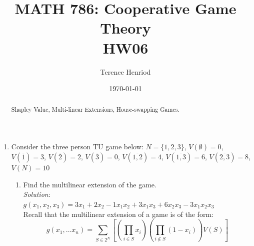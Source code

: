 \documentclass{article}
\title{MATH 786: Cooperative Game Theory \\ HW06}
\author{Terence Henriod}
\date{\today}
\begin{document}
\maketitle

\begin{abstract}
Shapley Value, Multi-linear Extensions, House-swapping Games. 
\end{abstract}


\newpage
\begin{enumerate}
\item Consider the three person TU game below:
$N = \{1, 2, 3\}$, $V(\emptyset) = 0$, $V(\overline{1}) = 3$, $V(\overline{2}) = 2$, $V(\overline{3}) = 0$, $V(\overline{1, 2}) = 4$, $V(\overline{1, 3}) = 6$, $V(\overline{2, 3}) = 8$, $V(N) = 10$

  \begin{enumerate}
  \item Find the multilinear extension of the game. \\

  \textit{Solution}: \\

  $g(x_{1}, x_{2}, x_{3}) =
         3x_{1} + 2x_{2} - 1x_{1}x_{2} + 3x_{1}x_{3} + 6x_{2}x_{3} - 3x_{1}x_{2}x_{3}$ \\

  \hfill\newline
  Recall that the multilinear extension of a game is of the form:
  \[ g(x_{1}, \dots x_{n}) = \sum_{S \in 2^{N}}{[(\prod_{i \in S}{x_{i}})(\prod_{i \not\in S}{(1 - x_{i})})V(S)]} \]


\end{enumerate}
\end{enumerate}
\end{document}
